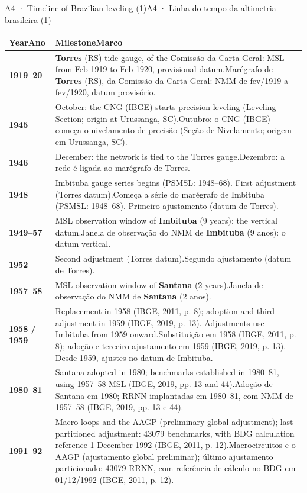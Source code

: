 \documentclass[aspectratio=169,11pt]{beamer}
\newcommand{\tr}[2]{\ifEN#2\else#1\fi}
\begin{document}
\begin{frame}{\tr{A4 · Linha do tempo da altimetria brasileira (1)}{A4 · Timeline of Brazilian leveling (1)}}
  \tiny
  \renewcommand{\arraystretch}{1.25}
  \begin{tabular}{@{}lL{11.8cm}@{}}
    \toprule
    \textbf{\tr{Ano}{Year}} & \textbf{\tr{Marco}{Milestone}} \\
    \midrule
    \textbf{1919--20} & \tr{Marégrafo de \textbf{Torres} (RS), da Comissão da Carta Geral: NMM de fev/1919 a fev/1920, datum provisório.}{\textbf{Torres} (RS) tide gauge, of the Comissão da Carta Geral: MSL from Feb 1919 to Feb 1920, provisional datum.} \\
    \textbf{1945} & \tr{Outubro: o CNG (IBGE) começa o nivelamento de precisão (Seção de Nivelamento; origem em Urussanga, SC).}{October: the CNG (IBGE) starts precision leveling (Leveling Section; origin at Urussanga, SC).} \\
    \textbf{1946} & \tr{Dezembro: a rede é ligada ao marégrafo de Torres.}{December: the network is tied to the Torres gauge.} \\
    \textbf{1948} & \tr{Começa a série do marégrafo de Imbituba (PSMSL: 1948--68). Primeiro ajustamento (datum de Torres).}{Imbituba gauge series begins (PSMSL: 1948--68). First adjustment (Torres datum).} \\
    \textbf{1949--57} & \tr{Janela de observação do NMM de \textbf{Imbituba} (9 anos): o datum vertical.}{MSL observation window of \textbf{Imbituba} (9 years): the vertical datum.} \\
    \textbf{1952} & \tr{Segundo ajustamento (datum de Torres).}{Second adjustment (Torres datum).} \\
    \textbf{1957--58} & \tr{Janela de observação do NMM de \textbf{Santana} (2 anos).}{MSL observation window of \textbf{Santana} (2 years).} \\
    \textbf{1958 / 1959} & \tr{Substituição em 1958 (IBGE, 2011, p. 8); adoção e terceiro ajustamento em 1959 (IBGE, 2019, p. 13). Desde 1959, ajustes no datum de Imbituba.}{Replacement in 1958 (IBGE, 2011, p. 8); adoption and third adjustment in 1959 (IBGE, 2019, p. 13). Adjustments use Imbituba from 1959 onward.} \\
    \textbf{1980--81} & \tr{Adoção de Santana em 1980; RRNN implantadas em 1980--81, com NMM de 1957--58 (IBGE, 2019, pp. 13 e 44).}{Santana adopted in 1980; benchmarks established in 1980--81, using 1957--58 MSL (IBGE, 2019, pp. 13 and 44).} \\
    \textbf{1991--92} & \tr{Macrocircuitos e o AAGP (ajustamento global preliminar); último ajustamento particionado: \num{43079} RRNN, com referência de cálculo no BDG em 01/12/1992 (IBGE, 2011, p. 12).}{Macro-loops and the AAGP (preliminary global adjustment); last partitioned adjustment: \num{43079} benchmarks, with BDG calculation reference 1 December 1992 (IBGE, 2011, p. 12).} \\
    \bottomrule
  \end{tabular}
\end{frame}
\end{document}
